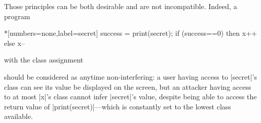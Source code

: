 Those principles can be both desirable and are not incompatible.
Indeed, a program

\newsavebox%
\ifsecret
\begin{lrbox}{\ifsecret}
\begin{minipage}{.4\textwidth}
\begin{whilelisting}*[numbers=none,label=secret]
success = print(secret);
if (success==0)
  then x++
else x--
\end{whilelisting}
\end{minipage}
\end{lrbox}

\noindent\usebox\ifsecret{ }\hfill{}with the class assignment
\hspace{-4em}
\begin{minipage}{.37\textwidth}
\end{minipage}

\noindent should be considered as anytime
non-interfering: a user having access to
\prc|secret|'s class can see its value be displayed on the screen, but an
attacker having access to at most \prc|x|'s class cannot infer \prc|secret|'s
value, despite being able to access the return value of
\prc|print(secret)|---which is constantly set to the lowest class available.

